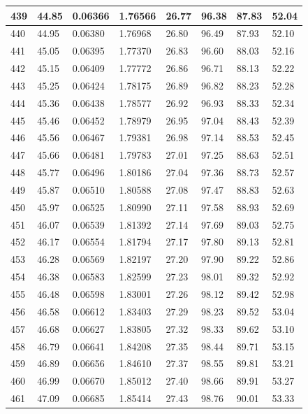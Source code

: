 \documentclass[12pt,a4paper,twoside]{article}
\begin{document}
\begin{center}
\begin{longtable}{l l l l | l l l l}
439 & 44.85 & 0.06366 & 1.76566 & 26.77 & 96.38 & 87.83 & 52.04 \\ \hline
440 & 44.95 & 0.06380 & 1.76968 & 26.80 & 96.49 & 87.93 & 52.10 \\ \hline
441 & 45.05 & 0.06395 & 1.77370 & 26.83 & 96.60 & 88.03 & 52.16 \\ \hline
442 & 45.15 & 0.06409 & 1.77772 & 26.86 & 96.71 & 88.13 & 52.22 \\ \hline
443 & 45.25 & 0.06424 & 1.78175 & 26.89 & 96.82 & 88.23 & 52.28 \\ \hline
444 & 45.36 & 0.06438 & 1.78577 & 26.92 & 96.93 & 88.33 & 52.34 \\ \hline
445 & 45.46 & 0.06452 & 1.78979 & 26.95 & 97.04 & 88.43 & 52.39 \\ \hline
446 & 45.56 & 0.06467 & 1.79381 & 26.98 & 97.14 & 88.53 & 52.45 \\ \hline
447 & 45.66 & 0.06481 & 1.79783 & 27.01 & 97.25 & 88.63 & 52.51 \\ \hline
448 & 45.77 & 0.06496 & 1.80186 & 27.04 & 97.36 & 88.73 & 52.57 \\ \hline
449 & 45.87 & 0.06510 & 1.80588 & 27.08 & 97.47 & 88.83 & 52.63 \\ \hline
450 & 45.97 & 0.06525 & 1.80990 & 27.11 & 97.58 & 88.93 & 52.69 \\ \hline
451 & 46.07 & 0.06539 & 1.81392 & 27.14 & 97.69 & 89.03 & 52.75 \\ \hline
452 & 46.17 & 0.06554 & 1.81794 & 27.17 & 97.80 & 89.13 & 52.81 \\ \hline
453 & 46.28 & 0.06569 & 1.82197 & 27.20 & 97.90 & 89.22 & 52.86 \\ \hline
454 & 46.38 & 0.06583 & 1.82599 & 27.23 & 98.01 & 89.32 & 52.92 \\ \hline
455 & 46.48 & 0.06598 & 1.83001 & 27.26 & 98.12 & 89.42 & 52.98 \\ \hline
456 & 46.58 & 0.06612 & 1.83403 & 27.29 & 98.23 & 89.52 & 53.04 \\ \hline
457 & 46.68 & 0.06627 & 1.83805 & 27.32 & 98.33 & 89.62 & 53.10 \\ \hline
458 & 46.79 & 0.06641 & 1.84208 & 27.35 & 98.44 & 89.71 & 53.15 \\ \hline
459 & 46.89 & 0.06656 & 1.84610 & 27.37 & 98.55 & 89.81 & 53.21 \\ \hline
460 & 46.99 & 0.06670 & 1.85012 & 27.40 & 98.66 & 89.91 & 53.27 \\ \hline
461 & 47.09 & 0.06685 & 1.85414 & 27.43 & 98.76 & 90.01 & 53.33 \\ \hline

\end{longtable}
\end{center}
\end{document}
